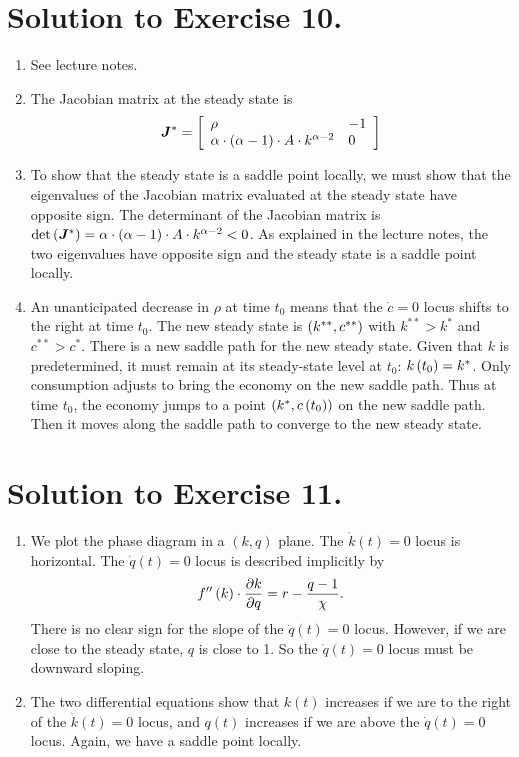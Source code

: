 \documentclass[letterpaper,12pt,leqno]{article}
\begin{document}
\section*{Solution to Exercise 10.}
\begin{enumerate}
\item See lecture notes.
\item  The Jacobian matrix at the steady state is
\begin{align*}
\bm{J}^{*}=\left[ 
\begin{array}{ll}
\rho  & -1 \\ 
\alpha \cdot \left( \alpha -1 \right)\cdot  A\cdot k^{\alpha -2} & 0
\end{array} \right] 
\end{align*}
\item To show that the steady state is a saddle point locally, we must show that the eigenvalues of the Jacobian matrix evaluated at the steady state have opposite sign. The determinant of the Jacobian matrix is  $\det \left( \bm{J}^{*} \right) =\alpha\cdot  \left( \alpha -1 \right)\cdot A\cdot k^{\alpha -2}<0$. As explained in the lecture notes, the two eigenvalues have opposite sign and the steady state is a saddle point locally.

\item An unanticipated decrease in $\rho $ at time $t_{0}$ means that the $\dot{c}=0$ locus shifts to the right at time $t_{0}$. The new steady state is $\left( k^{**},c^{**} \right) $ with $k^{* *}>k^*$ and $c^{* *}>c^*$. There is a new saddle path for the new steady state. Given that $k$ is predetermined, it must remain at its steady-state level at $t_{0}$: $k\left( t_{0} \right) =k^*$. Only consumption adjusts to bring the economy on the new saddle path. Thus at time $t_{0}$, the economy jumps to a point $\left( k^*,c\left( t_{0} \right) \right)$ on the new saddle path. Then it moves along the saddle path to converge to the new steady state.
\end{enumerate}

\section*{Solution to Exercise 11.}
\begin{enumerate}
\item We plot the phase diagram in a $(k,q)$ plane. The $\dot{k}(t)=0$ locus is horizontal. The $\dot{q}(t)=0$ locus is described implicitly by
\begin{align*}
f''\left( k \right) \cdot \frac{\partial k}{\partial q}=r-\frac{q-1}{\chi}.
\end{align*}
There is no clear sign for the slope of the $\dot{q}(t)=0$ locus. However, if we are close to the steady state,  $q$ is close to 1. So the $\dot{q}(t)=0$ locus must be downward sloping.
\item The two differential equations show that $k(t)$ increases if we are to the right of the $\dot{k}(t)=0$ locus, and $q(t)$ increases if we are above the $\dot{q}(t)=0$ locus. Again, we have a saddle point locally.
\end{enumerate}
\end{document}
